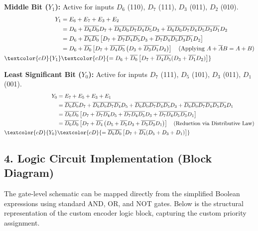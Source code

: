 \documentclass[12pt,a3paper]{article}
\begin{document}
\begin{enumerate}
\begin{tcolorbox}[enhanced,breakable,ansbox,colback=cD!4,colframe=cD,boxrule=0.8pt,arc=5pt,title={\textbf{Answer}},fonttitle=\bfseries\color{white},colbacktitle=cD]
\textbf{Middle Bit ($Y_1$):} Active for inputs $D_6$ (110), $D_7$ (111), $D_3$ (011), $D_2$ (010).
\begin{align*}
    Y_1 &= E_6 + E_7 + E_3 + E_2 \\
    &= D_6 + \overline{D_6}\overline{D_0}D_7 + \overline{D_6}\overline{D_0}\overline{D_7}\overline{D_4}\overline{D_5}D_3 + \overline{D_6}\overline{D_0}\overline{D_7}\overline{D_4}\overline{D_5}\overline{D_3}\overline{D_1}D_2 \\
    &= D_6 + \overline{D_6}\overline{D_0} \left[ D_7 + \overline{D_7}\overline{D_4}\overline{D_5}D_3 + \overline{D_7}\overline{D_4}\overline{D_5}\overline{D_3}\overline{D_1}D_2 \right] \\
    &= D_6 + \overline{D_0} \left[ D_7 + \overline{D_4}\overline{D_5} \left( D_3 + \overline{D_3}\overline{D_1}D_2 \right) \right] \quad \text{(Applying $A + \overline{A}B = A + B$)} \\
    \textcolor{cD}{Y_1} &\textcolor{cD}{= D_6 + \overline{D_0} \left[ D_7 + \overline{D_4}\overline{D_5} (D_3 + \overline{D_1}D_2) \right]}
\end{align*}

\textbf{Least Significant Bit ($Y_0$):} Active for inputs $D_7$ (111), $D_5$ (101), $D_3$ (011), $D_1$ (001).
\begin{align*}
    Y_0 &= E_7 + E_5 + E_3 + E_1 \\
    &= \overline{D_6}\overline{D_0}D_7 + \overline{D_6}\overline{D_0}\overline{D_7}\overline{D_4}D_5 + \overline{D_6}\overline{D_0}\overline{D_7}\overline{D_4}\overline{D_5}D_3 + \overline{D_6}\overline{D_0}\overline{D_7}\overline{D_4}\overline{D_5}\overline{D_3}D_1 \\
    &= \overline{D_6}\overline{D_0} \left[ D_7 + \overline{D_7}\overline{D_4}D_5 + \overline{D_7}\overline{D_4}\overline{D_5}D_3 + \overline{D_7}\overline{D_4}\overline{D_5}\overline{D_3}D_1 \right] \\
    &= \overline{D_6}\overline{D_0} \left[ D_7 + \overline{D_4} \left( D_5 + \overline{D_5}D_3 + \overline{D_5}\overline{D_3}D_1 \right) \right] \quad \text{(Reduction via Distributive Law)} \\
    \textcolor{cD}{Y_0} &\textcolor{cD}{= \overline{D_6}\overline{D_0} \left[ D_7 + \overline{D_4} (D_5 + D_3 + D_1) \right]}
\end{align*}

\subsection*{4. Logic Circuit Implementation (Block Diagram)}
The gate-level schematic can be mapped directly from the simplified Boolean expressions using standard AND, OR, and NOT gates. Below is the structural representation of the custom encoder logic block, capturing the custom priority assignment.


\end{tcolorbox}
\end{enumerate}
\end{document}
